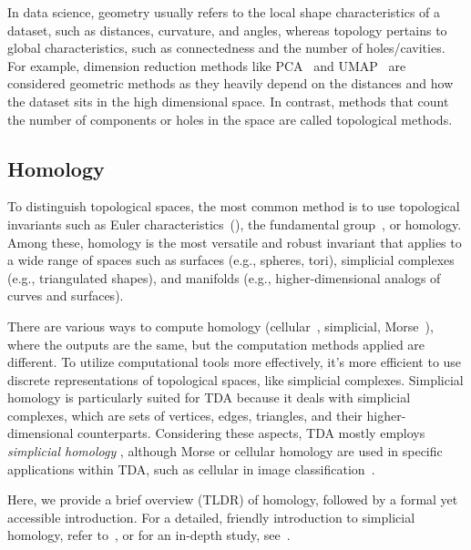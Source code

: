 In data science, geometry usually refers to the local shape characteristics of a dataset, such as distances, curvature, and angles, whereas topology pertains to global characteristics, such as connectedness and the number of holes/cavities. For example, dimension reduction methods like PCA~\cite{pcatutorial} and UMAP~\cite{mcinnes2018umap} are considered geometric methods as they heavily depend on the distances and how the dataset sits in the high dimensional space. In contrast, methods that count the number of components or holes in the space are called topological methods.




\subsection{Homology} \label{sec:homology}

To distinguish topological spaces, the most common method is to use topological invariants such as Euler characteristics~(), the fundamental group~\cite{armstrong2013basic}, or homology. Among these, homology is the most versatile and robust invariant that applies to a wide range of spaces such as surfaces (e.g., spheres, tori), simplicial complexes (e.g., triangulated shapes), and manifolds (e.g., higher-dimensional analogs of curves and surfaces). 


There are various ways to compute homology (cellular~\cite{hatcher2002algebraic}, simplicial, Morse~\cite{matsumoto2002introduction}), where the outputs are the same, but the computation methods applied are different. To utilize computational tools more effectively,  it's more efficient to use discrete representations of topological spaces, like simplicial complexes. Simplicial homology is particularly suited for TDA because it deals with simplicial complexes, which are sets of vertices, edges, triangles, and their higher-dimensional counterparts. Considering these aspects, TDA mostly employs \textit{simplicial homology} , 
although Morse or cellular homology are used in specific applications within TDA, such as cellular in image classification~\cite{kannan2019persistent, onus2022quantifying}.



 Here, we provide a brief overview (TLDR) of homology, followed by a formal yet accessible introduction. For a detailed, friendly introduction to simplicial homology, refer to~\cite[Chapter 8]{armstrong2013basic}, or for an in-depth study, see~\cite{hatcher2002algebraic,munkres2018elements}.

